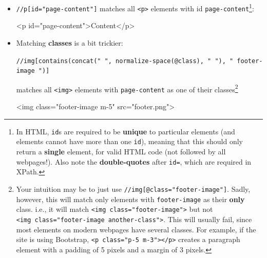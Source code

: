 \documentclass[
  letterpaper,
  DIV=11,
  numbers=noendperiod,
  oneside]{scrreprt}
\newenvironment{Shaded}{\begin{snugshade}}{\end{snugshade}}
\newcommand{\ErrorTok}[1]{\textcolor[rgb]{0.68,0.00,0.00}{#1}}
\newcommand{\KeywordTok}[1]{\textcolor[rgb]{0.00,0.23,0.31}{#1}}
\newcommand{\NormalTok}[1]{\textcolor[rgb]{0.00,0.23,0.31}{#1}}
\newcommand{\OtherTok}[1]{\textcolor[rgb]{0.00,0.23,0.31}{#1}}
\newcommand{\StringTok}[1]{\textcolor[rgb]{0.13,0.47,0.30}{#1}}
\begin{document}
\begin{itemize}
\item
  \texttt{\textquotesingle{}//p{[}id="page-content"{]}\textquotesingle{}}
  matches all \texttt{\textless{}p\textgreater{}} elements with id
  \texttt{page-content}\footnote{In HTML, \texttt{id}s are required to
    be \textbf{unique} to particular elements (and elements cannot have
    more than one \texttt{id}), meaning that this should only return a
    \textbf{single} element, for valid HTML code (not followed by all
    webpages!). Also note the \textbf{double-quotes} after \texttt{id=},
    which are required in XPath.}:

\begin{Shaded}
\begin{Highlighting}[]
\KeywordTok{\textless{}p} \ErrorTok{id}\OtherTok{=}\StringTok{"page{-}content"}\KeywordTok{\textgreater{}}\NormalTok{Content}\KeywordTok{\textless{}/p\textgreater{}}
\end{Highlighting}
\end{Shaded}
\item
  Matching \textbf{classes} is a bit trickier:

  {\texttt{\textquotesingle{}//img{[}contains(concat("\ ",\ normalize-space(@class),\ "\ "),\ "\ footer-image\ "){]}\textquotesingle{}}}

  matches all \texttt{\textless{}img\textgreater{}} elements with
  \texttt{page-content} as one of their classes\footnote{Your intuition
    may be to just use
    \texttt{\textquotesingle{}//img{[}@class="footer-image"{]}\textquotesingle{}}.
    Sadly, however, this will match only elements with
    \texttt{footer-image} as their \textbf{only} class. i.e., it will
    match \texttt{\textless{}img\ class="footer-image"\textgreater{}}
    but not
    \texttt{\textless{}img\ class="footer-image\ another-class"\textgreater{}}.
    This will usually fail, since most elements on modern webpages have
    several classes. For example, if the site is using Bootstrap,
    \texttt{\textless{}p\ class="p-5\ m-3"\textgreater{}\textless{}/p\textgreater{}}
    creates a paragraph element with a padding of 5 pixels and a margin
    of 3 pixels.}

\begin{Shaded}
\begin{Highlighting}[]
\KeywordTok{\textless{}img} \ErrorTok{class}\OtherTok{=}\StringTok{"footer{-}image m{-}5"} \ErrorTok{src}\OtherTok{=}\StringTok{"footer.png"}\KeywordTok{\textgreater{}}
\end{Highlighting}
\end{Shaded}
\end{itemize}
\end{document}
